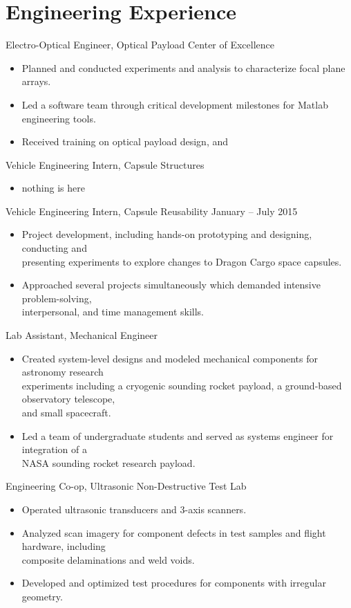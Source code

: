 \documentclass[10pt,final,sans]{resume}
\begin{document}
\section{Engineering Experience}
Electro-Optical Engineer, Optical Payload Center of Excellence
\begin{itemize}
  \item Planned and conducted experiments and analysis to characterize focal plane arrays.
  \item Led a software team through critical development milestones for Matlab engineering tools. 
  \item Received training on optical payload design, and 
\end{itemize} 
Vehicle Engineering Intern, Capsule Structures
\begin{itemize}
  \item nothing is here
\end{itemize}

Vehicle Engineering Intern, Capsule Reusability \hfill January -- July 2015
\begin{itemize}
  \item Project development, including hands-on prototyping and designing, conducting and \\
  presenting experiments to explore changes to Dragon Cargo space capsules.
  \item Approached several projects simultaneously which demanded intensive problem-solving, \\
  interpersonal, and time management skills.
\end{itemize}

Lab Assistant, Mechanical Engineer
\begin{itemize}
  \item Created system-level designs and modeled mechanical components for astronomy research \\ 
  experiments including a cryogenic sounding rocket payload, a ground-based observatory telescope, \\
  and small spacecraft.
  \item Led a team of undergraduate students and served as systems engineer for integration of a \\
  NASA sounding rocket research payload.
\end{itemize}
Engineering Co-op, Ultrasonic Non-Destructive Test Lab
\begin{itemize}
  \item Operated ultrasonic transducers and 3-axis scanners.
  \item Analyzed scan imagery for component defects in test samples and flight hardware, including \\
  composite delaminations and weld voids.
  \item Developed and optimized test procedures for components with irregular geometry.
\end{itemize}
\end{document}
